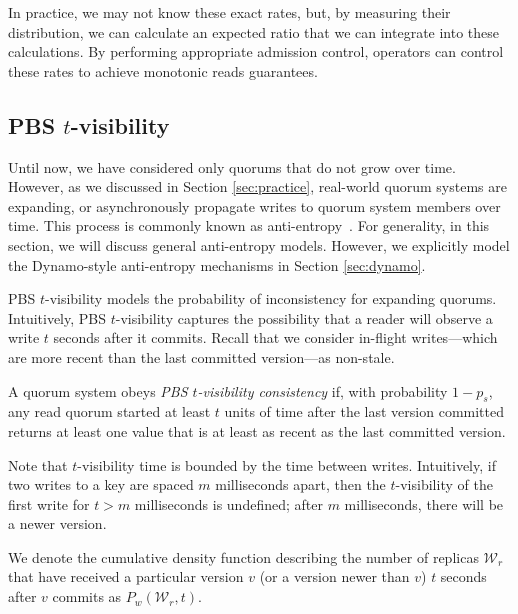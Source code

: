 \documentclass{vldb}
\newcommand{\subsectionskip}{-0em}
\begin{document}
In practice, we may not know these exact rates, but, by measuring
their distribution, we can calculate an expected ratio that we can
integrate into these calculations.  By performing appropriate
admission control, operators can control these rates to achieve
monotonic reads guarantees.

\vspace{\subsectionskip}\subsection{PBS $t$-visibility}
\label{sec:tvis}

Until now, we have considered only quorums that do not grow over time.
However, as we discussed in Section \ref{sec:practice}, real-world quorum
systems are expanding, or asynchronously propagate writes to quorum system
members over time.  This process is commonly known as
anti-entropy~\cite{antientropy}.  For generality, in this section, we
will discuss general anti-entropy models. However, we explicitly model
the Dynamo-style anti-entropy mechanisms in Section \ref{sec:dynamo}.

PBS $t$-visibility models the probability of inconsistency for
expanding quorums.  Intuitively, PBS $t$-visibility captures the
possibility that a reader will observe a write $t$ seconds after it
commits.  Recall that we consider in-flight writes---which are more
recent than the last committed version---as non-stale.

\begin{definition}
A quorum system obeys \textit{PBS $t$-visibility consistency} if, with
probability $1-p_{s}$, any read quorum started at least $t$ units
of time after the last version committed returns at least one value
that is at least as recent as the last committed version.
\end{definition}

Note that $t$-visibility time is bounded by the time between writes.
Intuitively, if two writes to a key are spaced $m$ milliseconds apart,
then the $t$-visibility of the first write for $t > m$ milliseconds is
undefined; after $m$ milliseconds, there will be a newer version.

We denote the cumulative density function describing the number of
replicas $\mathcal{W}_r$ that have received a particular version $v$ (or
a version newer than $v$) $t$ seconds after $v$ commits as
$P_w(\mathcal{W}_r, t)$.
\end{document}
